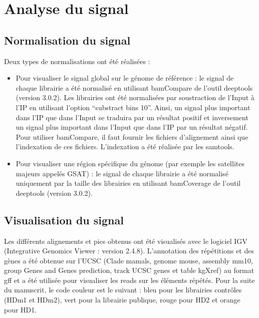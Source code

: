 \documentclass[a4paper,12pt,times]{report}
\begin{document}
          
    \section{Analyse du signal}

         \subsection{Normalisation du signal}      
         Deux types de normalisations ont été réalisées : 
         \begin{itemize}
         \item Pour visualiser le signal global sur le génome de référence : le signal de chaque librairie a été normalisé en utilisant bamCompare de l'outil deeptools \cite{deeptools} (version 3.0.2). 
      Les librairies ont été normalisées par soustraction de l'Input à l'IP en utilisant l'option ``substract bins 10''.
    \newline
      Ainsi, un signal  plus important dans l'IP que dans l'Input se traduira par un résultat positif et inversement un signal plus important dans l'Input que dans l'IP par un résultat négatif.
      Pour utiliser bamCompare, il faut fournir les fichiers d'alignement ainsi que l'indexation de ces fichiers. L'indexation a été réalisée par les samtools.
      \item Pour visualiser une région spécifique du génome (par exemple les satellites majeurs appelés GSAT) : le signal de chaque librairie a été normalisé uniquement par la taille des librairies en utilisant bamCoverage de l'outil deeptools (version 3.0.2).
       \end{itemize}
       
    \subsection{Visualisation du signal}
      Les différents alignements et pics obtenus ont été visualisés avec le logiciel IGV (Integrative Genomics Viewer \cite{IGV} : version 2.4.8).
       L'annotation des répétitions et des gènes a été obtenue sur l'UCSC (Clade mamals, genome mouse, assembly mm10, group Genes and Genes prediction, track UCSC genes et table kgXref) au format gff et a été utilisée pour visualiser les reads sur les éléments répétés. 
      Pour la suite du manuscrit, le code couleur est le suivant : bleu pour les librairies contrôles (HDm1 et HDm2), vert pour la librairie publique, rouge pour HD2 et orange pour HD1.
      
\end{document}
